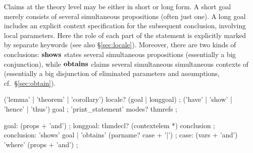 Claims at the theory level may be either in short or long form.  A
short goal merely consists of several simultaneous propositions (often
just one).  A long goal includes an explicit context specification for
the subsequent conclusion, involving local parameters.  Here the role
of each part of the statement is explicitly marked by separate
keywords (see also \S\ref{sec:locale}).
Moreover, there are two
kinds of conclusions: ${\mathord{\mathbf{shows}}}$ states several
simultaneous propositions (essentially a big conjunction), while
${\mathord{\mathbf{obtains}}}$ claims several simultaneous simultaneous
contexts of (essentially a big disjunction of eliminated parameters
and assumptions, cf.\ \S\ref{sec:obtain}).

\begin{rail}
  ('lemma' | 'theorem' | 'corollary') locale? (goal | longgoal)
  ;
  ('have' | 'show' | 'hence' | 'thus') goal
  ;
  'print\_statement' modes? thmrefs
  ;
  
  goal: (props + 'and')
  ;
  longgoal: thmdecl? (contextelem *) conclusion
  ;
  conclusion: 'shows' goal | 'obtains' (parname? case + '|')
  ;
  case: (vars + 'and') 'where' (props + 'and')
  ;
\end{rail}

